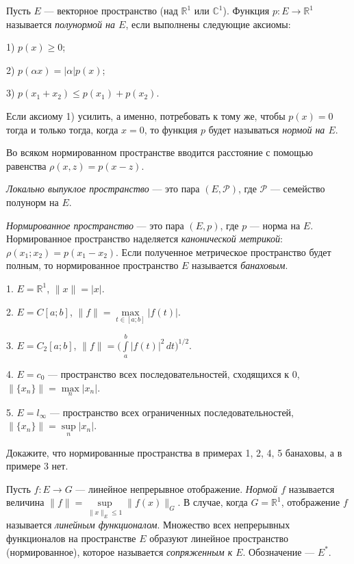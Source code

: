 \documentclass[12pt,titlepage, a4paper]{article}
\begin{document}


\begin{defen}
Пусть $E$ --- векторное пространство (над $\mathbb{R}^1$ или
$\mathbb{C}^1$). Функция $p\colon E\to\mathbb{R}^1$ называется
\emph{полунормой на $E$}, если выполнены следующие аксиомы:

1) $p(x)\geqslant0$;

2) $p(\alpha x)=|\alpha|p(x)$;

3) $p(x_1+x_2)\leqslant p(x_1)+p(x_2)$.

Если аксиому 1) усилить, а именно, потребовать к тому же, чтобы
$p(x)=0$ тогда и только тогда, когда $x=0$, то функция $p$ будет
называться \emph{нормой на $E$}.
\end{defen}

Во всяком нормированном пространстве вводится расстояние с помощью
равенства $\rho(x,z)=p(x-z)$.

\begin{defen}
\emph{Локально выпуклое пространство} --- это пара
$(E,\mathcal{P})$, где $\mathcal{P}$ --- семейство полунорм на $E$.

\emph{Нормированное пространство} --- это пара $(E,p)$, где $p$ ---
норма на $E$. Нормированное пространство наделяется
\emph{канонической метрикой}: $\rho(x_1;x_2)=p(x_1-x_2)$. Если
полученное метрическое пространство будет полным, то нормированное
пространство $E$ называется \emph{банаховым}.
\end{defen}

\prim

1. $E=\mathbb{R}^1$, $\|x\|=|x|$.

2. $E=C[a;b]$, $\|f\|=\max\limits_{t\in[a;b]}|f(t)|$.

3. $E=C_2[a;b]$,
$\|f\|=\Big(\int\limits_a^b\!|f(t)|^2\,dt\Big)^{1/2}$.

4. $E=c_0$ --- пространство всех последовательностей, сходящихся к
0, $\|\{x_n\}\|=\max\limits_n|x_n|$.

5. $E=l_\infty$ --- пространство всех ограниченных
последовательностей, $\|\{x_n\}\|=\sup\limits_n|x_n|$.

\begin{upr}
Докажите, что нормированные пространства в примерах 1, 2, 4, 5
банаховы, а в примере 3 нет.
\end{upr}

\begin{defen}
Пусть $f\colon E\to G$ --- линейное непрерывное отображение.
\emph{Нормой $f$} называется величина
$\|f\|=\sup\limits_{\|x\|_E\leqslant1}\|f(x)\|_G$. В случае, когда
$G=\mathbb{R}^1$, отображение $f$ называется \emph{линейным
функционалом}. Множество всех непрерывных функционалов на
пространстве $E$ образуют линейное пространство (нормированное),
которое называется \emph{сопряженным к $E$}. Обозначение --- $E^*$.
\end{defen}
\end{document}
